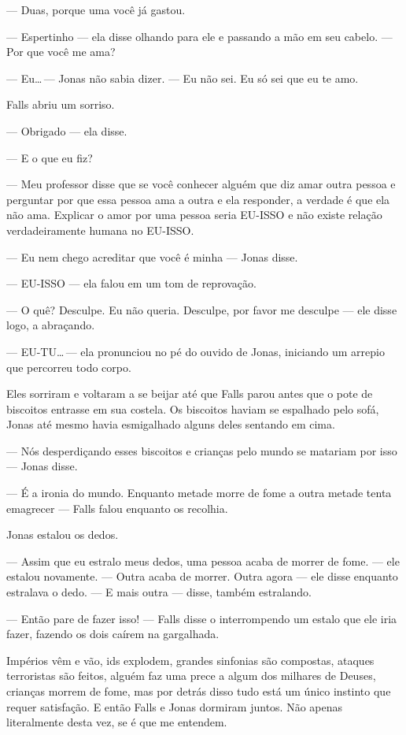--- Duas, porque uma você já gastou.

--- Espertinho --- ela disse\mudanca{,} olhando para ele e passando a mão em seu cabelo. --- Por que você me ama?

--- Eu\ldots\,--- Jonas não sabia dizer. --- Eu não sei. Eu só sei que eu te amo.

Falls abriu um sorriso.

--- Obrigado --- ela disse.

--- E o que eu fiz?

--- Meu professor disse que se você conhecer alguém que diz amar outra pessoa e perguntar por que essa pessoa ama a outra e ela responder, a verdade é que ela não ama. Explicar o amor por uma pessoa seria EU-ISSO e não existe relação verdadeiramente humana no EU-ISSO.

--- Eu nem chego acreditar que você é minha --- Jonas disse.

--- EU-ISSO --- ela falou em um tom de reprovação.

--- O quê? Desculpe. Eu não queria. Desculpe, por favor me desculpe --- ele disse logo, a abraçando.

--- EU-TU\ldots\,--- ela pronunciou no pé do ouvido de Jonas, iniciando um arrepio que percorreu todo  corpo.

Eles sorriram e voltaram a se beijar até que Falls parou\mudanca{,} antes que o pote de biscoitos entrasse em sua costela. Os biscoitos haviam se espalhado pelo sofá, Jonas até mesmo havia esmigalhado alguns deles sentando em cima.

--- Nós desperdiçando esses biscoitos e crianças pelo mundo se matariam por isso ---  Jonas disse.

--- É a ironia do mundo. Enquanto metade morre de fome\mudanca{,} a outra metade tenta emagrecer --- Falls falou enquanto\mudanca{,} os recolhia.

Jonas estalou os dedos.

--- Assim que eu estralo meus dedos, uma pessoa acaba de morrer de fome. --- ele estalou novamente. --- Outra acaba de morrer. Outra agora --- ele disse enquanto estralava o dedo. --- E mais outra --- disse, também estralando.

--- Então pare de fazer isso! --- Falls disse o interrompendo um estalo que ele iria fazer, fazendo os dois caírem na gargalhada.

Impérios vêm e vão, ids explodem, grandes sinfonias são compostas, ataques terroristas são feitos, alguém faz uma prece a algum dos milhares de Deuses, crianças morrem de fome, mas por detrás disso tudo está um único instinto que requer satisfação. E então Falls e Jonas dormiram juntos. Não apenas literalmente desta vez, se é que me entendem.
